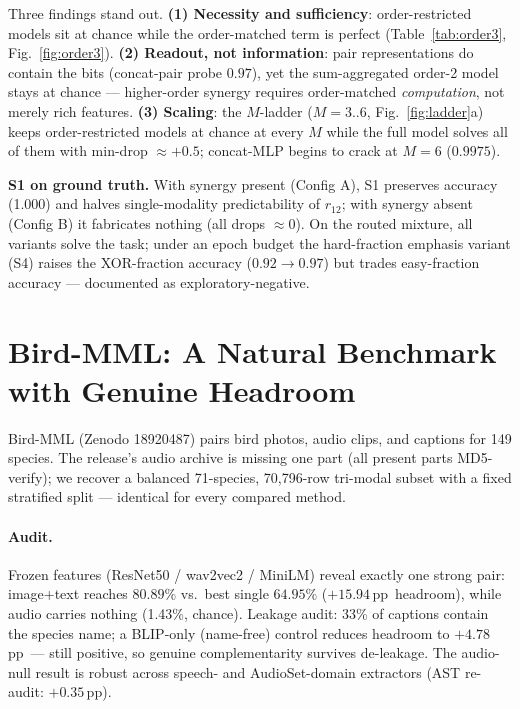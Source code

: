 \documentclass[10pt,twocolumn,letterpaper]{article}
\newcommand{\rI}{r_{12}}
\newcommand{\pp}{\,pp}
\begin{document}
Three findings stand out. \textbf{(1) Necessity and sufficiency}: order-restricted models sit at
chance while the order-matched term is perfect (Table~\ref{tab:order3},
Fig.~\ref{fig:order3}). \textbf{(2) Readout, not information}: pair representations do contain
the bits (concat-pair probe $0.97$), yet the sum-aggregated order-2 model stays at chance ---
higher-order synergy requires order-matched \emph{computation}, not merely rich features.
\textbf{(3) Scaling}: the $M$-ladder ($M{=}3..6$, Fig.~\ref{fig:ladder}a) keeps
order-restricted models at chance at every $M$ while the full model solves all of them with
min-drop ${\approx}{+}0.5$; concat-MLP begins to crack at $M{=}6$ ($0.9975$).

\textbf{S1 on ground truth.} With synergy present (Config A), S1 preserves accuracy (1.000) and
halves single-modality predictability of $\rI$; with synergy absent (Config B) it fabricates
nothing (all drops ${\approx}0$). On the routed mixture, all variants solve the task; under an
epoch budget the hard-fraction emphasis variant (S4) raises the XOR-fraction accuracy
($0.92{\to}0.97$) but trades easy-fraction accuracy --- documented as exploratory-negative.

\section{Bird-MML: A Natural Benchmark with Genuine Headroom}\label{sec:birdmml}
Bird-MML \cite{confu} (Zenodo 18920487) pairs bird photos, audio clips, and captions for 149
species. The release's audio archive is missing one part (all present parts MD5-verify); we
recover a balanced 71-species, 70{,}796-row tri-modal subset with a fixed stratified split ---
identical for every compared method.

\paragraph{Audit.} Frozen features (ResNet50 / wav2vec2 / MiniLM) reveal exactly one strong pair:
image+text reaches $80.89\%$ vs.\ best single $64.95\%$ ($+15.94$\pp\ headroom), while audio
carries nothing (1.43\%, chance). Leakage audit: 33\% of captions contain the species name; a
BLIP-only (name-free) control reduces headroom to $+4.78$\pp\ --- still positive, so genuine
complementarity survives de-leakage. The audio-null result is robust across speech- and
AudioSet-domain extractors (AST re-audit: $+0.35$\pp).
\end{document}
